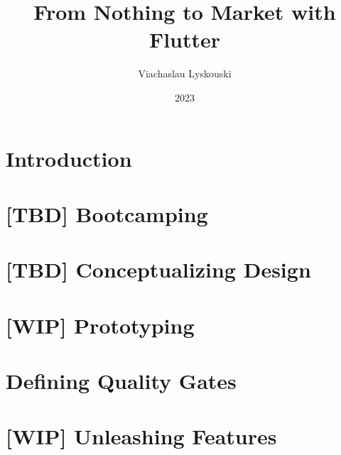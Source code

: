\documentclass[12pt, a4paper, twoside]{extreport}
\author{Viachaslau Lyskouski}
\title{From Nothing to Market with Flutter}
\date{2023}
\begin{document}


\maketitle

%

\tableofcontents



\newpage
\section*{Introduction}


\newpage
\section{[TBD] Bootcamping}





\newpage
\section{[TBD] Conceptualizing Design}


\newpage
\section{[WIP] Prototyping}







\newpage
\section{Defining Quality Gates}







\newpage
\section{[WIP] Unleashing Features}





\end{document}
